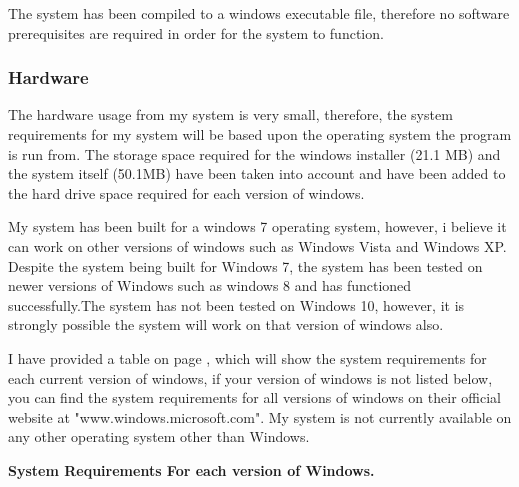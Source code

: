 The system has been compiled to a windows executable file, therefore no software prerequisites are required in order for the system to function.

\subsubsection{Hardware}

The hardware usage from my system is very small, therefore, the system requirements for my system will be based upon the operating system the program is run from. The storage space required for the windows installer (21.1 MB) and the system itself (50.1MB) have been taken into account and have been added to the hard drive space required for each version of windows.

 My system has been built for a windows 7 operating system, however, i believe it can work on other versions of windows such as Windows Vista and Windows XP. Despite the system being built for Windows 7, the system has been tested on newer versions of Windows such as windows 8 and has functioned successfully.The system has not been tested on Windows 10, however, it is strongly possible the system will work on that version of windows also. 

I have provided a table on page \pageref{hardware-table}, which will show the system requirements for each current version of windows, if your version of windows is not listed below, you can find the system requirements for all versions of windows on their official website at "www.windows.microsoft.com". My system is not currently available on any other operating system other than Windows.

\pagebreak

\textbf{System Requirements For each version of Windows.} \newline

